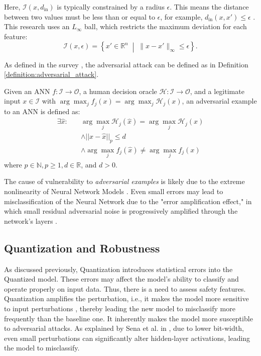 Here, $\mathcal{I}(x,d_{\text{in}})$ is typically constrained by a radius $\epsilon$. This means the distance between two values must be less than or equal to $\epsilon$, for example, $d_{\text{in}}(x,x') \le \epsilon$ \cite{huangSurveySafetyTrustworthiness2020}. This research uses an $L_\infty$ ball, which restricts the maximum deviation for each feature:
\[
\mathcal{I}(x,\epsilon) = \left\{ x' \in \mathbb{R}^n \;\middle|\; \|x - x'\|_\infty \le \epsilon \right\}.
\]

As defined in the survey \cite{huangSurveySafetyTrustworthiness2020}, the adversarial attack can be defined as in Definition \ref{definition:adversarial_attack}.

\begin{definition}\label{definition:adversarial_attack}
Given an ANN $f : \mathcal{I} \to \mathcal{O}$, a human decision oracle $\mathcal{H} : \mathcal I \to \mathcal{O}$, and a legitimate input $x \in \mathcal{I}$ with $\arg \max_j f_j(x) = \arg \max_j \mathcal{H}_j(x)$, an adversarial example to an ANN is defined as:
\begin{equation}
\begin{aligned}
\exists \hat{x} : \quad & \arg \max_j \mathcal{H}_j(\hat{x}) = \arg \max_j \mathcal{H}_j(x) \\
& \wedge ||x - \hat{x}||_p \leq d \\
& \wedge \arg \max_j f_j(\hat{x}) \neq \arg \max_j f_j(x)
\end{aligned}
\end{equation}
where $p \in \mathbb{N}, p \geq 1, d \in \mathbb{R}$, and $d > 0$.
\end{definition}

The cause of vulnerability to \textit{adversarial examples} is likely due to the extreme nonlinearity of Neural Network Models \cite{goodfellowExplainingHarnessingAdversarial2015}. Even small errors may lead to misclassification of the Neural Network due to the "error amplification effect," in which small residual adversarial noise is progressively amplified through the network's layers \cite{liaoDefenseAdversarialAttacks2018}.  

\subsection*{Quantization and Robustness}
As discussed previously, Quantization introduces statistical errors into the Quantized model. These errors may affect the model's ability to classify and operate properly on input data. Thus, there is a need to assess safety features. Quantization amplifies the perturbation, i.e., it makes the model more sensitive to input perturbations \cite{zhangQEBVerifQuantizationError2023}, thereby leading the new model to misclassify more frequently than the baseline one. It inherently makes the model more susceptible to adversarial attacks. As explained by Sena et al. in \cite{sena2021verifying}, due to lower bit-width, even small perturbations can significantly alter hidden-layer activations, leading the model to misclassify.

